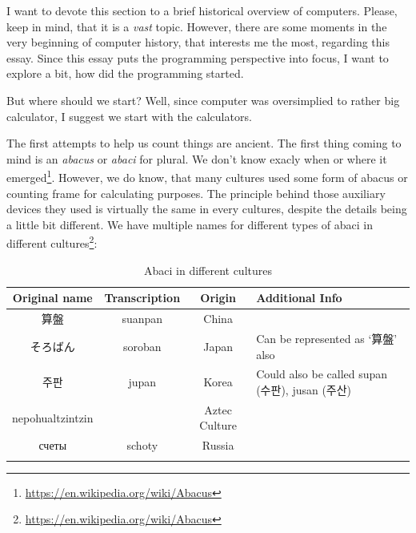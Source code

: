 \documentclass{article}
\begin{document}
            I want to devote this section to a brief historical overview of computers. Please, keep in mind, that it is a \emph{vast} topic. However, there are some moments in the very
            beginning of computer history, that interests me the most, regarding this essay. Since this essay puts the programming perspective into focus, I want to explore 
            a bit, how did the programming started. \par

            But where should we start? Well, since computer was oversimplied to rather big calculator, I suggest we start with the calculators.\par

            The first attempts to help us count things are ancient. The first thing coming to mind is an \emph{abacus} or \emph{abaci} for plural. We don't know exacly when or
            where it emerged\footnote{\href{https://en.wikipedia.org/wiki/Abacus}{https://en.wikipedia.org/wiki/Abacus}}. However, we do know, that many cultures used some form
            of abacus or counting frame for calculating purposes. The principle behind those auxiliary devices they used is virtually the same in every cultures, despite the 
            details being a little bit different. We have multiple names for different types of abaci in different
            cultures\footnote{\href{https://en.wikipedia.org/wiki/Abacus}{https://en.wikipedia.org/wiki/Abacus}}:
            \begin{table}[h]
                \begin{longtable} {|c|c|c|p{4cm}|}
                    \hline
                        Original name & Transcription & Origin & Additional Info \\\hline
                        算盤 & suanpan & China & \\\hline
                        そろばん & soroban & Japan & Can be represented as `算盤' also \\\hline
                        주판 & jupan & Korea & Could also be called supan (수판), jusan (주산) \\\hline
                        nepohualtzintzin & & Aztec Culture & \\\hline
                        счеты & schoty & Russia & \\\hline
                        \caption{Abaci in different cultures}
                    \end{longtable}
            \end{table}
\end{document}
